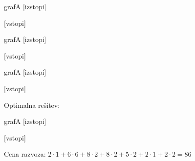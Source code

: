 \documentclass[14pt]{extarticle}
\begin{document}
\begin{razvoz}{grafA}
    [izstopi]


    [vstopi]
\end{razvoz}

\begin{razvoz}{grafA}
    [izstopi]


    [vstopi]
\end{razvoz}

\begin{razvoz}{grafA}
    [izstopi]


    [vstopi]
\end{razvoz}

Optimalna rešitev:

\begin{razvoz}{grafA}
    [izstopi]


    [vstopi]
\end{razvoz}

Cena razvoza: $2 \cdot 1 + 6 \cdot 6 + 8 \cdot 2 + 8 \cdot 2 + 5 \cdot 2 + 2 \cdot 1 + 2 \cdot 2 = 86$

\clearpage
\end{document}
